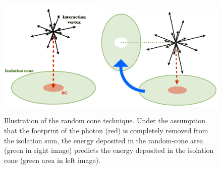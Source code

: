 \begin{figure} \label{fig-RandomConeIsolation}
\begin{center}
\includegraphics[width=0.45\textwidth]{Figures/RandomCone1.png}\includegraphics[width=0.55\textwidth]{Figures/RandomCone2.png}
\caption{Illustration of the random cone technique. Under the assumption that the footprint of the photon (red) is completely removed from the isolation sum, the energy deposited in the random-cone area (green in right image) predicts the energy deposited in the isolation cone (green area in left image). \cite{MarcoThesis}}
\end{center}
\end{figure}

